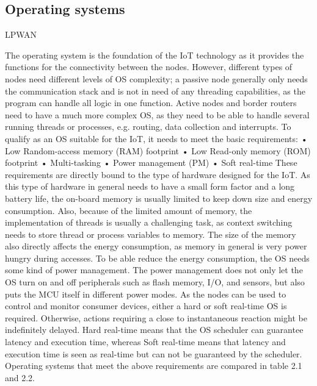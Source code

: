 \subsection{Operating systems}

{LPWAN}

The operating system is the foundation of the IoT technology as it provides the functions for the connectivity between the nodes.
However,
	different types of nodes need different levels of OS complexity;
	a passive node generally only needs the communication stack and is not in need of any threading capabilities,
	as the program can handle all logic in one function.
Active nodes and border routers need to have a much more complex OS,
	as they need to be able to handle several running threads or processes,
	e.g.
routing,
	data collection and interrupts.
To qualify as an OS suitable for the IoT,
	it needs to meet the basic requirements:
	• Low Random-access memory (RAM) footprint 
	• Low Read-only memory (ROM) footprint 
	• Multi-tasking • Power management (PM) 
	• Soft real-time These requirements are directly bound to the type of hardware designed for the IoT.
As this type of hardware in general needs to have a small form factor and a long battery life,
	the on-board memory is usually limited to keep down size and energy consumption.
Also,
	because of the limited amount of memory,
	the implementation of threads is usually a challenging task,
	as context switching needs to store thread or process variables to memory.
The size of the memory also directly affects the energy consumption,
	as memory in general is very power hungry during accesses.
To be able reduce the energy consumption,
	the OS needs some kind of power management.
The power management does not only let the OS turn on and off peripherals such as flash memory,
	I/O,
	and sensors,
	but also puts the MCU itself in different power modes.
As the nodes can be used to control and monitor consumer devices,
	either a hard or soft real-time OS is required.
Otherwise,
	actions requiring a close to instantaneous reaction might be indefinitely delayed.
Hard real-time means that the OS scheduler can guarantee latency and execution time,
	whereas Soft real-time means that latency and execution time is seen as real-time but can not be guaranteed by the scheduler.
Operating systems that meet the above requirements are compared in table 2.1 and 2.2.

